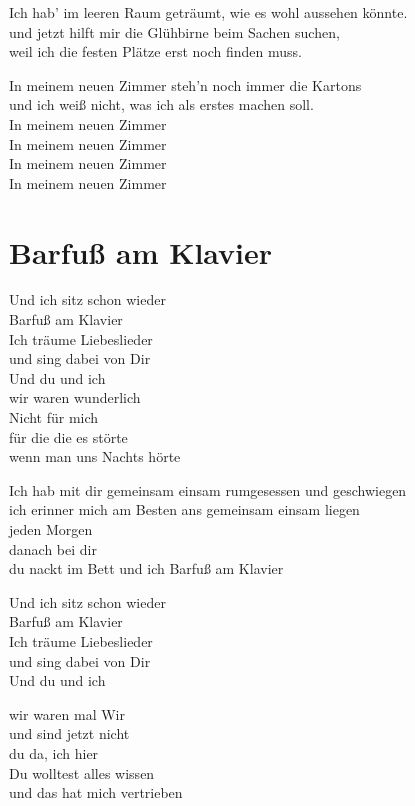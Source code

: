 \documentclass[]{book}
\begin{document}
Ich hab' im leeren Raum geträumt, wie es wohl aussehen könnte.\\
und jetzt hilft mir die Glühbirne beim Sachen suchen,\\
weil ich die festen Plätze erst noch finden muss.

In meinem neuen Zimmer steh'n noch immer die Kartons\\
und ich weiß nicht, was ich als erstes machen soll.\\
In meinem neuen Zimmer\\
In meinem neuen Zimmer\\
In meinem neuen Zimmer\\
In meinem neuen Zimmer

\hypertarget{barfu-am-klavier}{%
\section{Barfuß am Klavier}\label{barfu-am-klavier}}

Und ich sitz schon wieder\\
Barfuß am Klavier\\
Ich träume Liebeslieder\\
und sing dabei von Dir\\
Und du und ich\\
wir waren wunderlich\\
Nicht für mich\\
für die die es störte\\
wenn man uns Nachts hörte

Ich hab mit dir gemeinsam einsam rumgesessen und geschwiegen\\
ich erinner mich am Besten ans gemeinsam einsam liegen\\
jeden Morgen\\
danach bei dir\\
du nackt im Bett und ich Barfuß am Klavier

Und ich sitz schon wieder\\
Barfuß am Klavier\\
Ich träume Liebeslieder\\
und sing dabei von Dir\\
Und du und ich

wir waren mal Wir\\
und sind jetzt nicht\\
du da, ich hier\\
Du wolltest alles wissen\\
und das hat mich vertrieben
\end{document}
